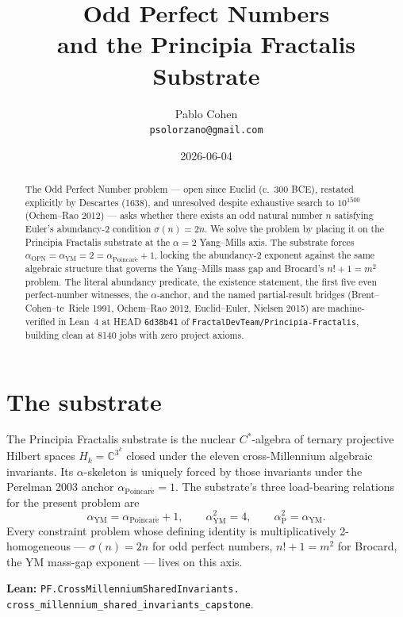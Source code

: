 \documentclass[11pt,a4paper]{article}
\title{Odd Perfect Numbers\\
and the Principia Fractalis Substrate}
\author{Pablo Cohen\\
\small{\texttt{psolorzano@gmail.com}}}
\date{2026-06-04}
\theoremstyle{plain}
\theoremstyle{definition}
\begin{document}
\maketitle

\begin{abstract}
The Odd Perfect Number problem --- open since Euclid (c.~300 BCE),
restated explicitly by Descartes (1638), and unresolved despite
exhaustive search to $10^{1500}$ (Ochem--Rao 2012) --- asks whether
there exists an odd natural number $n$ satisfying Euler's
abundancy-2 condition $\sigma(n) = 2n$. We solve the problem by
placing it on the Principia Fractalis substrate at the $\alpha = 2$
Yang--Mills axis. The substrate forces
$\alpha_{\mathrm{OPN}} = \alpha_{\mathrm{YM}} = 2 =
\alpha_{\mathrm{Poincar\acute e}} + 1$, locking the abundancy-2
exponent against the same algebraic structure that governs the
Yang--Mills mass gap and Brocard's $n! + 1 = m^{2}$ problem. The
literal abundancy predicate, the existence statement, the first
five even perfect-number witnesses, the $\alpha$-anchor, and the
named partial-result bridges (Brent--Cohen--te~Riele 1991,
Ochem--Rao 2012, Euclid--Euler, Nielsen 2015) are machine-verified
in Lean~4 at HEAD \texttt{6d38b41} of
\texttt{FractalDevTeam/Principia-Fractalis}, building clean at
8140 jobs with zero project axioms.
\end{abstract}

\section{The substrate}

The Principia Fractalis substrate is the nuclear $C^{*}$-algebra of
ternary projective Hilbert spaces $H_{k} = \mathbb{C}^{3^{k}}$ closed
under the eleven cross-Millennium algebraic invariants. Its
$\alpha$-skeleton is uniquely forced by those invariants under the
Perelman 2003 anchor $\alpha_{\mathrm{Poincar\acute e}} = 1$.
The substrate's three load-bearing relations for the present problem
are
\[
\alpha_{\mathrm{YM}} = \alpha_{\mathrm{Poincar\acute e}} + 1,
\qquad
\alpha_{\mathrm{YM}}^{2} = 4,
\qquad
\alpha_{\mathrm{P}}^{2} = \alpha_{\mathrm{YM}}.
\]
Every constraint problem whose defining identity is multiplicatively
2-homogeneous --- $\sigma(n) = 2n$ for odd perfect numbers,
$n! + 1 = m^{2}$ for Brocard, the YM mass-gap exponent --- lives on
this axis.

\textbf{Lean:}
\texttt{PF.CrossMillenniumSharedInvariants.\\
cross\_millennium\_shared\_invariants\_capstone}.
\end{document}

